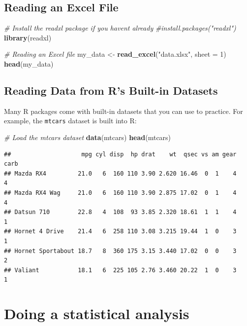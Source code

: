 \documentclass[
]{book}
\newenvironment{Shaded}{\begin{snugshade}}{\end{snugshade}}
\newcommand{\AttributeTok}[1]{\textcolor[rgb]{0.13,0.29,0.53}{#1}}
\newcommand{\CommentTok}[1]{\textcolor[rgb]{0.56,0.35,0.01}{\textit{#1}}}
\newcommand{\DecValTok}[1]{\textcolor[rgb]{0.00,0.00,0.81}{#1}}
\newcommand{\FunctionTok}[1]{\textcolor[rgb]{0.13,0.29,0.53}{\textbf{#1}}}
\newcommand{\NormalTok}[1]{#1}
\newcommand{\OtherTok}[1]{\textcolor[rgb]{0.56,0.35,0.01}{#1}}
\newcommand{\StringTok}[1]{\textcolor[rgb]{0.31,0.60,0.02}{#1}}
\begin{document}
\subsection{Reading an Excel File}\label{reading-an-excel-file}

\begin{Shaded}
\begin{Highlighting}[]
\CommentTok{\# Install the readxl package if you haven\textquotesingle{}t already}
\CommentTok{\#install.packages("readxl")}
\FunctionTok{library}\NormalTok{(readxl)}

\CommentTok{\# Reading an Excel file}
\NormalTok{my\_data }\OtherTok{\textless{}{-}} \FunctionTok{read\_excel}\NormalTok{(}\StringTok{"data.xlsx"}\NormalTok{, }\AttributeTok{sheet =} \DecValTok{1}\NormalTok{)}
\FunctionTok{head}\NormalTok{(my\_data)}
\end{Highlighting}
\end{Shaded}

\subsection{Reading Data from R's Built-in Datasets}\label{reading-data-from-rs-built-in-datasets}

Many R packages come with built-in datasets that you can use to practice. For example, the \texttt{mtcars} dataset is built into R:

\begin{Shaded}
\begin{Highlighting}[]
\CommentTok{\# Load the \textquotesingle{}mtcars\textquotesingle{} dataset}
\FunctionTok{data}\NormalTok{(mtcars)}
\FunctionTok{head}\NormalTok{(mtcars)}
\end{Highlighting}
\end{Shaded}

\begin{verbatim}
##                    mpg cyl disp  hp drat    wt  qsec vs am gear carb
## Mazda RX4         21.0   6  160 110 3.90 2.620 16.46  0  1    4    4
## Mazda RX4 Wag     21.0   6  160 110 3.90 2.875 17.02  0  1    4    4
## Datsun 710        22.8   4  108  93 3.85 2.320 18.61  1  1    4    1
## Hornet 4 Drive    21.4   6  258 110 3.08 3.215 19.44  1  0    3    1
## Hornet Sportabout 18.7   8  360 175 3.15 3.440 17.02  0  0    3    2
## Valiant           18.1   6  225 105 2.76 3.460 20.22  1  0    3    1
\end{verbatim}

\section{Doing a statistical analysis}\label{doing-a-statistical-analysis}
\end{document}

